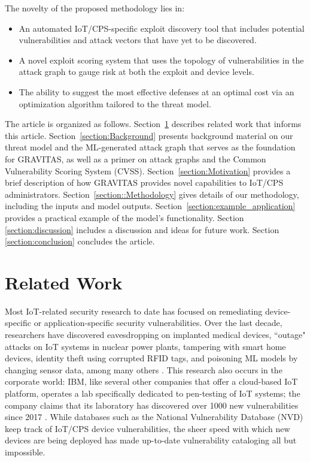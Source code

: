 \documentclass[10pt,journal,compsoc]{IEEEtran}
\begin{document}
\par The novelty of the proposed methodology lies in:

\begin{itemize}
    \item An automated IoT/CPS-specific exploit discovery tool that includes potential vulnerabilities and attack vectors that have yet to be discovered.
    \item A novel exploit scoring system that uses the topology of vulnerabilities in the attack graph to gauge risk at both the exploit and device levels.
    \item The ability to suggest the most effective defenses at an optimal cost via an optimization algorithm tailored to the threat model.
    
\end{itemize}

\par The article is organized as follows. Section~\ref{section:Related Work} describes related work 
that informs this article. Section~\ref{section:Background} presents background material on our threat model and the
ML-generated attack graph that serves as the foundation for GRAVITAS, as well as a primer on attack 
graphs and the Common Vulnerability Scoring System (CVSS). 
Section~\ref{section:Motivation} provides a brief 
description of how GRAVITAS provides novel capabilities to IoT/CPS administrators. 
Section~\ref{section::Methodology} gives details of our methodology, including the inputs and 
model outputs. Section~\ref{section:example_application} provides a practical example of the model's 
functionality. Section \ref{section:discussion} includes a discussion and ideas for future work. 
Section \ref{section:conclusion} concludes the article.

\section{Related Work}
\label{section:Related Work}

Most IoT-related security research to date has focused on remediating device-specific or
application-specific security vulnerabilities. Over the last decade, researchers have
discovered eavesdropping on implanted medical devices, ``outage"  attacks on IoT systems in
nuclear power plants, tampering with smart home devices, identity theft using corrupted RFID
tags, and poisoning ML models by changing sensor data, among many others \cite{nia2016, matrosov2011,
hernandez2014, juels2003, huang2011}. This research also occurs in the corporate world: IBM, like several other companies that offer a cloud-based IoT platform, operates a lab specifically dedicated to pen-testing of IoT systems; the company claims that its laboratory has discovered over 1000 new vulnerabilities since 2017 \cite{ibm2019}. While databases such as the National Vulnerability Database (NVD) keep track of IoT/CPS device vulnerabilities, the sheer speed with which new devices are being deployed has made up-to-date vulnerability cataloging all but impossible.
\end{document}
